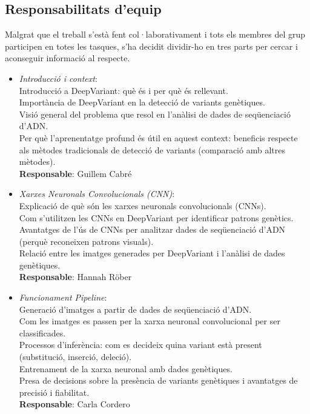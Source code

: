 \documentclass[a4paper]{article}
\begin{document}
	\subsection{Responsabilitats d'equip}
		Malgrat que el treball s'està fent col·laborativament i tots els membres del grup participen en totes les tasques, s'ha decidit dividir-ho en tres parts per cercar i aconseguir informació al respecte.
	\begin{itemize}
		\item \emph{Introducció i context}:\\
			Introducció a DeepVariant: què és i per què és rellevant.\\
			Importància de DeepVariant en la detecció de variants genètiques.\\
			Visió general del problema que resol en l'anàlisi de dades de seqüenciació d'ADN.\\
			Per què l'aprenentatge profund és útil en aquest context: beneficis respecte als mètodes tradicionals de detecció de variants (comparació amb altres mètodes).\\
			\textbf{Responsable}: Guillem Cabré\\
			
		\item \emph{Xarxes Neuronals Convolucionals (CNN)}:\\
			Explicació de què són les xarxes neuronals convolucionals (CNNs).\\
			Com s'utilitzen les CNNs en DeepVariant per identificar patrons genètics.\\
			Avantatges de l'ús de CNNs per analitzar dades de seqüenciació d'ADN (perquè reconeixen patrons visuals).\\
			Relació entre les imatges generades per DeepVariant i l'anàlisi de dades genètiques.\\
			\textbf{Responsable}: Hannah Röber\\
			
		\item \emph{Funcionament Pipeline}:\\
			Generació d'imatges a partir de dades de seqüenciació d'ADN.\\
			Com les imatges es passen per la xarxa neuronal convolucional per ser classificades.\\
			Processos d'inferència: com es decideix quina variant està present (substitució, inserció, deleció).\\
			Entrenament de la xarxa neuronal amb dades genètiques.\\
			Presa de decisions sobre la presència de variants genètiques i avantatges de precisió i fiabilitat.\\
			\textbf{Responsable}: Carla Cordero\\
	\end{itemize}
	
\end{document}

